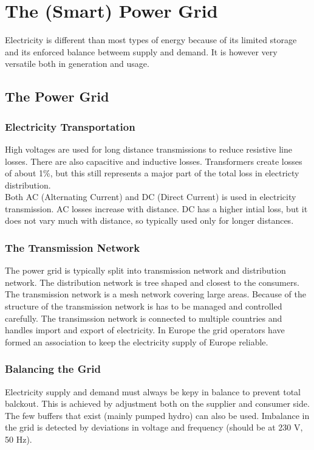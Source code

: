 \section{The (Smart) Power Grid}
Electricity is different than most types of energy because of its limited storage and its enforced balance betweem supply and demand. It is however very versatile both in generation and usage.

\subsection{The Power Grid}

\subsubsection{Electricity Transportation}
High voltages are used for long distance transmissions to reduce resistive line losses. There are also capacitive and inductive losses.
Transformers create losses of about 1\%, but this still represents a major part of the total loss in electricty distribution.\\

Both AC (Alternating Current) and DC (Direct Current) is used in electricity transmission.
AC losses increase with distance.
DC has a higher intial loss, but it does not vary much with distance, so typically used only for longer distances.

\subsubsection{The Transmission Network}
The power grid is typically split into transmission network and distribution network.
The distribution network is tree shaped and closest to the consumers.
The transmission network is a mesh network covering large areas.
Because of the structure of the transmission network is has to be managed and controlled carefully.
The transimssion network is connected to multiple countries and handles import and export of electricity. In Europe the grid operators have formed an association to keep the electricity supply of Europe reliable.

\subsubsection{Balancing the Grid}
Electricity supply and demand must always be kepy in balance to prevent total balckout.
This is achieved by adjustment both on the supplier and consumer side.
The few buffers that exist (mainly pumped hydro) can also be used. Imbalance in the grid is detected by deviations in voltage and frequency (should be at 230 V, 50 Hz).\\

